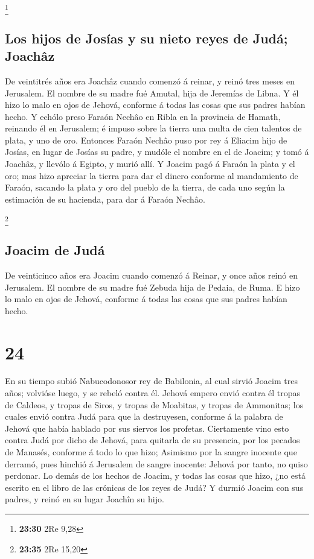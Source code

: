 \footnote{\textbf{23:30} 2Re 9,28}

\hypertarget{los-hijos-de-josuxedas-y-su-nieto-reyes-de-juduxe1-joachuxe2z}{%
\subsection{Los hijos de Josías y su nieto reyes de Judá;
Joachâz}\label{los-hijos-de-josuxedas-y-su-nieto-reyes-de-juduxe1-joachuxe2z}}

 De veintitrés años era Joachâz cuando comenzó á reinar,
y reinó tres meses en Jerusalem. El nombre de su madre fué Amutal, hija
de Jeremías de Libna.  Y él hizo lo malo en ojos de
Jehová, conforme á todas las cosas que sus padres habían hecho.
 Y echólo preso Faraón Nechâo en Ribla en la provincia de
Hamath, reinando él en Jerusalem; é impuso sobre la tierra una multa de
cien talentos de plata, y uno de oro.  Entonces Faraón
Nechâo puso por rey á Eliacim hijo de Josías, en lugar de Josías su
padre, y mudóle el nombre en el de Joacim; y tomó á Joachâz, y llevólo á
Egipto, y murió allí.  Y Joacim pagó á Faraón la plata y
el oro; mas hizo apreciar la tierra para dar el dinero conforme al
mandamiento de Faraón, sacando la plata y oro del pueblo de la tierra,
de cada uno según la estimación de su hacienda, para dar á Faraón
Nechâo.

\footnote{\textbf{23:35} 2Re 15,20}

\hypertarget{joacim-de-juduxe1}{%
\subsection{Joacim de Judá}\label{joacim-de-juduxe1}}

 De veinticinco años era Joacim cuando comenzó á Reinar,
y once años reinó en Jerusalem. El nombre de su madre fué Zebuda hija de
Pedaia, de Ruma.  E hizo lo malo en ojos de Jehová,
conforme á todas las cosas que sus padres habían hecho.

\hypertarget{section-23}{%
\section{24}\label{section-23}}

 En su tiempo subió Nabucodonosor rey de Babilonia, al
cual sirvió Joacim tres años; volvióse luego, y se rebeló contra él.
 Jehová empero envió contra él tropas de Caldeos, y tropas
de Siros, y tropas de Moabitas, y tropas de Ammonitas; los cuales envió
contra Judá para que la destruyesen, conforme á la palabra de Jehová que
había hablado por sus siervos los profetas.  Ciertamente
vino esto contra Judá por dicho de Jehová, para quitarla de su
presencia, por los pecados de Manasés, conforme á todo lo que hizo;
 Asimismo por la sangre inocente que derramó, pues hinchió
á Jerusalem de sangre inocente: Jehová por tanto, no quiso perdonar.
 Lo demás de los hechos de Joacim, y todas las cosas que
hizo, ¿no está escrito en el libro de las crónicas de los reyes de Judá?
 Y durmió Joacim con sus padres, y reinó en su lugar
Joachîn su hijo.


